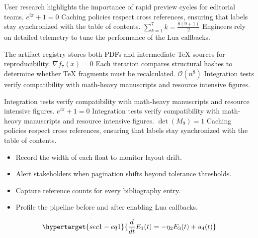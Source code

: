\documentclass[12pt,a4paper,twocolumn]{article}
\newcommand{\paraid}[1]{\par\noindent\hypertarget{#1}{\ignorespaces}}
\begin{document}
\paraid{sec1-p5}User research highlights the importance of rapid preview cycles for editorial teams. $e^{i\pi} + 1 = 0$ Caching policies respect cross references, ensuring that labels stay synchronized with the table of contents. $\sum_{k=1}^{7} k = \frac{8(9+1)}{2}$ Engineers rely on detailed telemetry to tune the performance of the Lua callbacks.
\par

\paraid{sec1-p6}The artifact registry stores both PDFs and intermediate TeX sources for reproducibility. $\nabla f_{7}(x) = 0$ Each iteration compares structural hashes to determine whether TeX fragments must be recalculated. $\mathcal{O}(n^{8})$ Integration tests verify compatibility with math-heavy manuscripts and resource intensive figures.
\par

\paraid{sec1-p7}Integration tests verify compatibility with math-heavy manuscripts and resource intensive figures. $e^{i\pi} + 1 = 0$ Integration tests verify compatibility with math-heavy manuscripts and resource intensive figures. $\det(M_{9}) = 1$ Caching policies respect cross references, ensuring that labels stay synchronized with the table of contents.
\par

\begin{itemize}

\item 
        Record the width of each float to monitor layout drift.
      

\item 
        Alert stakeholders when pagination shifts beyond tolerance thresholds.
      

\item 
        Capture reference counts for every bibliography entry.
      

\item 
        Profile the pipeline before and after enabling Lua callbacks.
      

\end{itemize}

\begin{equation}
\hypertarget{sec1-eq1}{\frac{d}{dt} E_{1}(t) = -\eta_{2} E_{3}(t) + u_{4}(t)}
\label{eq:sec1-eq1}
\end{equation}
\end{document}
